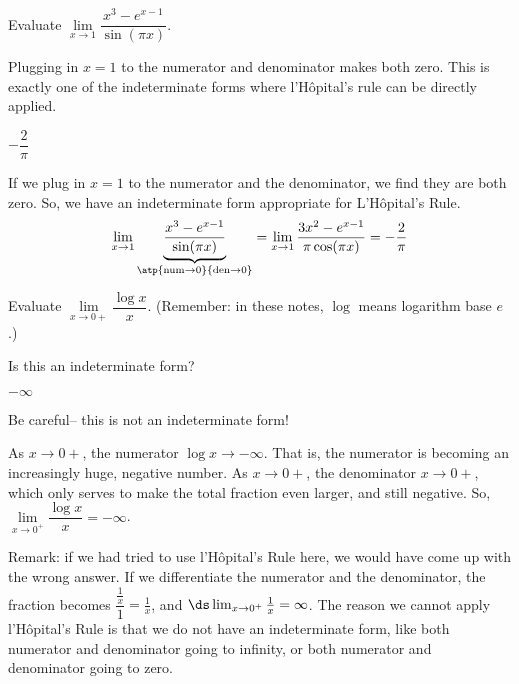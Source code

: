 \begin{Mquestion}[2009H]
Evaluate $\lim\limits_{x\rightarrow 1}\dfrac{x^3-e^{x-1}}{\sin(\pi x)}$.
\end{Mquestion}
\begin{hint}
Plugging in $x=1$ to the numerator and denominator makes both zero. This is exactly one of the indeterminate forms where l'H\^opital's rule can be directly applied.
\end{hint}
\begin{answer}  $-\dfrac{2}{\pi}$
\end{answer}
\begin{solution}
If we plug in $x=1$ to the numerator and the denominator, we find they are both zero. So, we have an indeterminate form appropriate for L'H\^opital's Rule.
\begin{align*}
\lim\limits_{x\rightarrow 1}\underbrace{\frac{x^3-e^{x-1}}{\sin(\pi x)}}_{\atp
	{\mathrm{num} \to 0}
	{\mathrm{den} \to 0}}
=\lim\limits_{x\rightarrow 1}\frac{3x^2-e^{x-1}}{\pi\cos(\pi x)}
=-\frac{2}{\pi}\end{align*}
\end{solution}


\begin{question}[2010H]
Evaluate $\lim\limits_{x\rightarrow 0+}\dfrac{\log x}{x}$. (Remember: in these notes, $\log$ means logarithm base $e$.)
\end{question}
\begin{hint}
Is this an indeterminate form?
\end{hint}
\begin{answer} $-\infty$
\end{answer}
\begin{solution}
Be careful-- this is not an indeterminate form!
\medskip

As $x\rightarrow 0+$, the numerator $\log x\rightarrow-\infty$. That is, the numerator is becoming an increasingly huge, negative number.
As $x\rightarrow 0+$, the denominator $x\rightarrow 0+$, which only serves to make the total fraction even larger, and still negative. So, $\lim\limits_{x\rightarrow 0^+}\dfrac{\log x}{x}
=-\infty$.
\medskip

Remark: if we had tried to use l'H\^opital's Rule here, we would have come up with the wrong answer. If we differentiate the numerator and the denominator, the fraction becomes $\dfrac{\frac{1}{x}}{1}=\frac{1}{x}$, and $\ds\lim_{x \to 0^+}\frac{1}{x}=\infty$. The reason we cannot apply l'H\^opital's Rule is that we do not have an indeterminate form, like both numerator and denominator going to infinity, or both numerator and denominator going to zero.
\end{solution}



